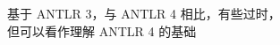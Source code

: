 \begin{frame}{}
  \begin{columns}
  \end{columns}

  \vspace{0.50cm}
  \begin{center}
    基于 ANTLR 3，与 ANTLR 4 相比，有些过时，\\[3pt]
    但可以看作理解 ANTLR 4 的基础
  \end{center}
\end{frame}

